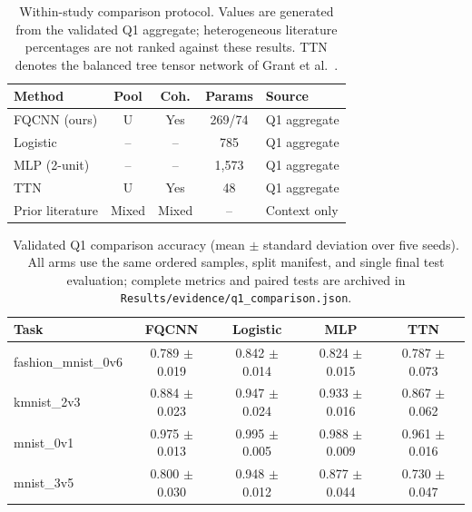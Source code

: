 \documentclass[conference]{IEEEtran}
\begin{document}
\begin{table}[!t]
\caption{Within-study comparison protocol. Values are generated from the validated Q1 aggregate; heterogeneous literature percentages are not ranked against these results. TTN denotes the balanced tree tensor network of Grant et al.~\cite{ref46}.}
\label{tab:comparison}
\centering
\begin{tabular}{@{}lcccl@{}}
\toprule
\textbf{Method} & \textbf{Pool} & \textbf{Coh.} & \textbf{Params} & \textbf{Source} \\
\midrule
FQCNN (ours) & U & Yes & 269/74 & Q1 aggregate \\
Logistic & -- & -- & 785 & Q1 aggregate \\
MLP (2-unit) & -- & -- & 1,573 & Q1 aggregate \\
TTN & U & Yes & 48 & Q1 aggregate \\
Prior literature & Mixed & Mixed & -- & Context only \\
\bottomrule
\end{tabular}
\end{table}

\begin{table}[!t]
\caption{Validated Q1 comparison accuracy (mean $\pm$ standard deviation over five seeds). All arms use the same ordered samples, split manifest, and single final test evaluation; complete metrics and paired tests are archived in \texttt{Results/evidence/q1\_comparison.json}.}
\label{tab:q1comparison}
\centering
\begin{tabular}{lcccc}
\toprule
\textbf{Task} & \textbf{FQCNN} & \textbf{Logistic} & \textbf{MLP} & \textbf{TTN} \\
\midrule
fashion\_mnist\_0v6 & 0.789 $\pm$ 0.019 & 0.842 $\pm$ 0.014 & 0.824 $\pm$ 0.015 & 0.787 $\pm$ 0.073 \\
kmnist\_2v3 & 0.884 $\pm$ 0.023 & 0.947 $\pm$ 0.024 & 0.933 $\pm$ 0.016 & 0.867 $\pm$ 0.062 \\
mnist\_0v1 & 0.975 $\pm$ 0.013 & 0.995 $\pm$ 0.005 & 0.988 $\pm$ 0.009 & 0.961 $\pm$ 0.016 \\
mnist\_3v5 & 0.800 $\pm$ 0.030 & 0.948 $\pm$ 0.012 & 0.877 $\pm$ 0.044 & 0.730 $\pm$ 0.047 \\
\bottomrule
\end{tabular}
\end{table}
\end{document}
